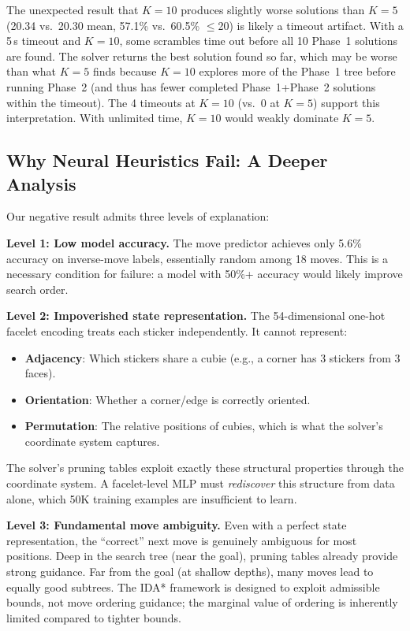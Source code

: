 \documentclass[10pt,twocolumn,a4paper]{article}
\begin{document}
The unexpected result that $K{=}10$ produces slightly worse solutions than $K{=}5$ (20.34 vs.\ 20.30 mean, 57.1\% vs.\ 60.5\% $\leq$20) is likely a timeout artifact. With a 5\,s timeout and $K{=}10$, some scrambles time out before all 10 Phase~1 solutions are found. The solver returns the best solution found so far, which may be worse than what $K{=}5$ finds because $K{=}10$ explores more of the Phase~1 tree before running Phase~2 (and thus has fewer completed Phase~1+Phase~2 solutions within the timeout). The 4 timeouts at $K{=}10$ (vs.\ 0 at $K{=}5$) support this interpretation. With unlimited time, $K{=}10$ would weakly dominate $K{=}5$.

\subsection{Why Neural Heuristics Fail: A Deeper Analysis}

Our negative result admits three levels of explanation:

\textbf{Level 1: Low model accuracy.} The move predictor achieves only 5.6\% accuracy on inverse-move labels, essentially random among 18 moves. This is a necessary condition for failure: a model with 50\%+ accuracy would likely improve search order.

\textbf{Level 2: Impoverished state representation.} The 54-dimensional one-hot facelet encoding treats each sticker independently. It cannot represent:
\begin{itemize}[leftmargin=*]
  \item \textbf{Adjacency}: Which stickers share a cubie (e.g., a corner has 3 stickers from 3 faces).
  \item \textbf{Orientation}: Whether a corner/edge is correctly oriented.
  \item \textbf{Permutation}: The relative positions of cubies, which is what the solver's coordinate system captures.
\end{itemize}
The solver's pruning tables exploit exactly these structural properties through the coordinate system. A facelet-level MLP must \emph{rediscover} this structure from data alone, which 50K training examples are insufficient to learn.

\textbf{Level 3: Fundamental move ambiguity.} Even with a perfect state representation, the ``correct'' next move is genuinely ambiguous for most positions. Deep in the search tree (near the goal), pruning tables already provide strong guidance. Far from the goal (at shallow depths), many moves lead to equally good subtrees. The IDA* framework is designed to exploit admissible bounds, not move ordering guidance; the marginal value of ordering is inherently limited compared to tighter bounds.
\end{document}
